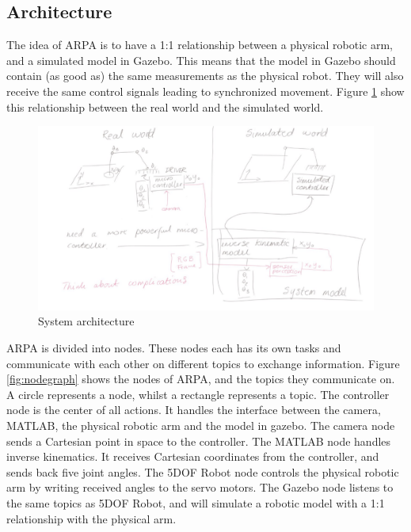 \documentclass[11pt,a4paper, titlepage]{article}
\begin{document}
\subsection{Architecture}
The idea of ARPA is to have a 1:1 relationship between a physical robotic arm, and a simulated model in Gazebo. This means that the model in Gazebo should contain (as good as) the same measurements as the physical robot. They will also receive the same control signals leading to synchronized movement. Figure \ref{fig:architecture} show this relationship between the real world and the simulated world.
	
	\begin{figure}[H]
		\includegraphics[width=\linewidth]{../Diagrams/Architecture.png}
		\caption{System architecture}
		\label{fig:architecture}
	\end{figure}
	
	ARPA is divided into nodes. These nodes each has its own tasks and communicate with each other on different topics to exchange information. Figure \ref{fig:nodegraph} shows the nodes of ARPA, and the topics they communicate on. A circle represents a node, whilst a rectangle represents a topic. The controller node is the center of all actions. It handles the interface between the camera, MATLAB, the physical robotic arm and the model in gazebo. The camera node  sends a Cartesian point in space to the controller. The MATLAB node handles inverse kinematics. It receives Cartesian coordinates from the controller, and sends back five joint angles. The 5DOF Robot node controls the physical robotic arm by writing received angles to the servo motors. The Gazebo node listens to the same topics as 5DOF Robot, and will simulate a robotic model with a 1:1 relationship with the physical arm.
	
\end{document}
